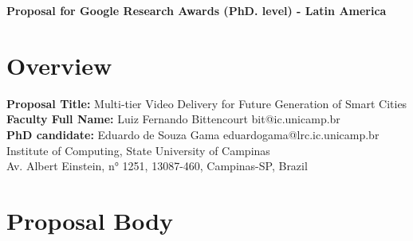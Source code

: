 \documentclass[a4paper, 11pt]{article}
\begin{document}
	\begin{center}
		{\bf Proposal for Google Research Awards (PhD. level) - Latin America}
	\end{center}

	\section{Overview}

	\noindent
	{\bf Proposal Title:} Multi-tier Video Delivery for Future Generation of Smart Cities \\
	{\bf Faculty Full Name:} Luiz Fernando Bittencourt \hfill bit@ic.unicamp.br \\
	{\bf PhD candidate:} Eduardo de Souza Gama \hfill eduardogama@lrc.ic.unicamp.br \\
	Institute of Computing, State University of Campinas \\
	Av. Albert Einstein, n° 1251, 13087-460, Campinas-SP, Brazil \\


	\section{Proposal Body}	
	
	
	
    

    
    
    
\end{document}
